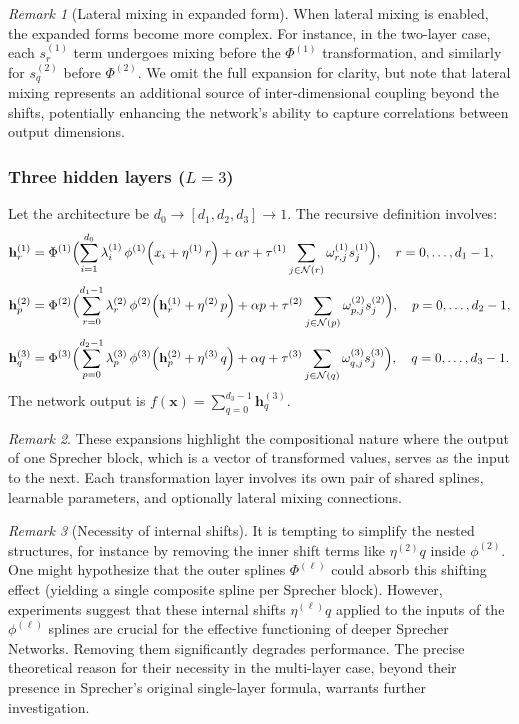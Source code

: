 \documentclass{article}
\theoremstyle{plain}
\theoremstyle{definition}
\theoremstyle{remark}
\newtheorem{remark}{Remark}
\newcommand{\mathpdf}[2]{\texorpdfstring{$#1$}{#2}}
\begin{document}
\begin{remark}[Lateral mixing in expanded form]
When lateral mixing is enabled, the expanded forms become more complex. For instance, in the two-layer case, each $s_r^{(1)}$ term undergoes mixing before the $\Phi^{(1)}$ transformation, and similarly for $s_q^{(2)}$ before $\Phi^{(2)}$. We omit the full expansion for clarity, but note that lateral mixing represents an additional source of inter-dimensional coupling beyond the shifts, potentially enhancing the network's ability to capture correlations between output dimensions.
\end{remark}

\subsubsection{Three hidden layers (\mathpdf{L=3}{L=3})}
Let the architecture be $d_0\to [d_1, d_2, d_3]\to1$. The recursive definition involves:
$$\begin{aligned}
\mathbf{h}^{(1)}_r &= \Phi^{(1)}\Bigl(\sum_{i=1}^{d_0}\lambda^{(1)}_{i}\,\phi^{(1)}\Bigl(x_i+\eta^{(1)}\,r\Bigr)+\alpha r + \tau^{(1)} \sum_{j \in \mathcal{N}(r)} \omega_{r,j}^{(1)} s_j^{(1)}\Bigr),\quad r=0,\dots,d_1-1,\\[1mm]
\mathbf{h}^{(2)}_p &= \Phi^{(2)}\Bigl(\sum_{r=0}^{d_1-1}\lambda^{(2)}_{r}\,\phi^{(2)}\Bigl(\mathbf{h}^{(1)}_r+\eta^{(2)}\,p\Bigr)+\alpha p + \tau^{(2)} \sum_{j \in \mathcal{N}(p)} \omega_{p,j}^{(2)} s_j^{(2)}\Bigr),\quad p=0,\dots,d_2-1,\\[1mm]
\mathbf{h}^{(3)}_q &= \Phi^{(3)}\Bigl(\sum_{p=0}^{d_2-1}\lambda^{(3)}_{p}\,\phi^{(3)}\Bigl(\mathbf{h}^{(2)}_p+\eta^{(3)}\,q\Bigr)+\alpha q + \tau^{(3)} \sum_{j \in \mathcal{N}(q)} \omega_{q,j}^{(3)} s_j^{(3)}\Bigr),\quad q=0,\dots,d_3-1.
\end{aligned}$$
The network output is $f(\mathbf{x})=\sum_{q=0}^{d_3-1}\mathbf{h}^{(3)}_q$. 

\begin{remark}
These expansions highlight the compositional nature where the output of one Sprecher block, which is a vector of transformed values, serves as the input to the next. Each transformation layer involves its own pair of shared splines, learnable parameters, and optionally lateral mixing connections.
\end{remark}

\begin{remark}[Necessity of internal shifts]\label{rem:shiftneeded}
It is tempting to simplify the nested structures, for instance by removing the inner shift terms like $\eta^{(2)}q$ inside $\phi^{(2)}$. One might hypothesize that the outer splines $\Phi^{(\ell)}$ could absorb this shifting effect (yielding a single composite spline per Sprecher block). However, experiments suggest that these internal shifts $\eta^{(\ell)}q$ applied to the inputs of the $\phi^{(\ell)}$ splines are crucial for the effective functioning of deeper Sprecher Networks. Removing them significantly degrades performance. The precise theoretical reason for their necessity in the multi-layer case, beyond their presence in Sprecher's original single-layer formula, warrants further investigation.
\end{remark}
\end{document}
